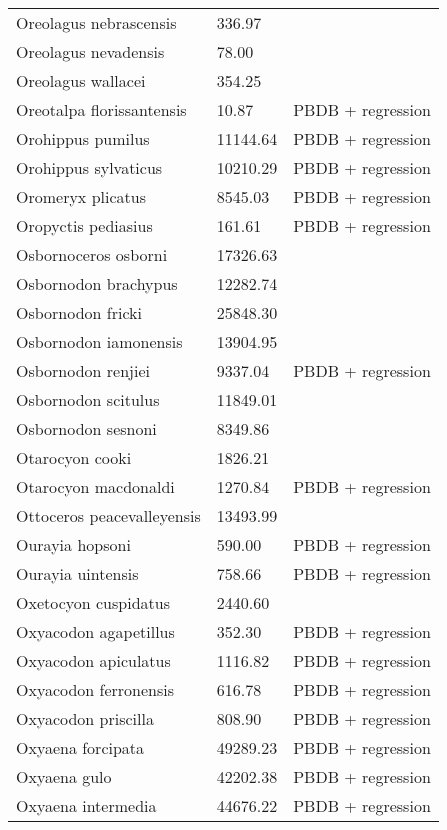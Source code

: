 \documentclass{article}
\begin{document}
\begin{center}
\begin{longtable}{p{} p{} p{} }
  Oreolagus nebrascensis & 336.97 & \cite{Tomiya2013} \\ 
  Oreolagus nevadensis & 78.00 & \cite{McKenna2011} \\ 
  Oreolagus wallacei & 354.25 & \cite{Tomiya2013} \\ 
  Oreotalpa florissantensis & 10.87 & PBDB + regression \\ 
  Orohippus pumilus & 11144.64 & PBDB + regression \\ 
  Orohippus sylvaticus & 10210.29 & PBDB + regression \\ 
  Oromeryx plicatus & 8545.03 & PBDB + regression \\ 
  Oropyctis pediasius & 161.61 & PBDB + regression \\ 
  Osbornoceros osborni & 17326.63 & \cite{Tomiya2013} \\ 
  Osbornodon brachypus & 12282.74 & \cite{Chester2012} \\ 
  Osbornodon fricki & 25848.30 & \cite{Tomiya2013} \\ 
  Osbornodon iamonensis & 13904.95 & \cite{Tomiya2013} \\ 
  Osbornodon renjiei & 9337.04 & PBDB + regression \\ 
  Osbornodon scitulus & 11849.01 & \cite{Tomiya2013} \\ 
  Osbornodon sesnoni & 8349.86 & \cite{Tomiya2013} \\ 
  Otarocyon cooki & 1826.21 & \cite{Tomiya2013} \\ 
  Otarocyon macdonaldi & 1270.84 & PBDB + regression \\ 
  Ottoceros peacevalleyensis & 13493.99 & \cite{Tomiya2013} \\ 
  Ourayia hopsoni & 590.00 & PBDB + regression \\ 
  Ourayia uintensis & 758.66 & PBDB + regression \\ 
  Oxetocyon cuspidatus & 2440.60 & \cite{Tomiya2013} \\ 
  Oxyacodon agapetillus & 352.30 & PBDB + regression \\ 
  Oxyacodon apiculatus & 1116.82 & PBDB + regression \\ 
  Oxyacodon ferronensis & 616.78 & PBDB + regression \\ 
  Oxyacodon priscilla & 808.90 & PBDB + regression \\ 
  Oxyaena forcipata & 49289.23 & PBDB + regression \\ 
  Oxyaena gulo & 42202.38 & PBDB + regression \\ 
  Oxyaena intermedia & 44676.22 & PBDB + regression \\ 

\end{longtable}
\end{center}
\end{document}
